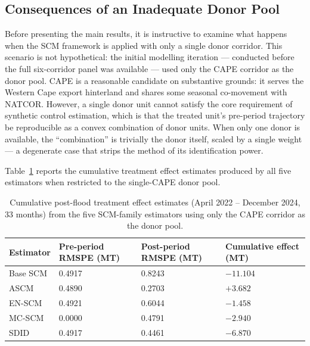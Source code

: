 \subsection{Consequences of an Inadequate Donor Pool}
\label{sec:res_1donor}

Before presenting the main results, it is instructive to examine what
happens when the SCM framework is applied with only a single donor
corridor.
This scenario is not hypothetical: the initial modelling iteration
--- conducted before the full six-corridor panel was available ---
used only the CAPE corridor as the donor pool.
CAPE is a reasonable candidate on substantive grounds: it serves the
Western Cape export hinterland and shares some seasonal co-movement
with NATCOR.
However, a single donor unit cannot satisfy the core requirement of
synthetic control estimation, which is that the treated unit's
pre-period trajectory be reproducible as a convex combination of donor
units.
When only one donor is available, the ``combination'' is trivially
the donor itself, scaled by a single weight --- a degenerate case that
strips the method of its identification power.

Table~\ref{tab:1donor} reports the cumulative treatment effect
estimates produced by all five estimators when restricted to the
single-CAPE donor pool.

\begin{table}[H]
  \centering
  \caption{Cumulative post-flood treatment effect estimates (April
           2022 -- December 2024, 33 months) from the five SCM-family
           estimators using only the CAPE corridor as the donor pool.}
  \label{tab:1donor}
  \begin{tabularx}{\textwidth}{lXXX}
    \toprule
    Estimator & Pre-period RMSPE (MT) & Post-period RMSPE (MT)
              & Cumulative effect (MT) \\
    \midrule
    Base SCM  & 0.4917 & 0.8243 & $-11.104$ \\
    ASCM      & 0.4890 & 0.2703 & $+3.682$  \\
    EN-SCM    & 0.4921 & 0.6044 & $-1.458$  \\
    MC-SCM    & 0.0000 & 0.4791 & $-2.940$  \\
    SDID      & 0.4917 & 0.4461 & $-6.870$  \\
    \bottomrule
  \end{tabularx}
\end{table}

